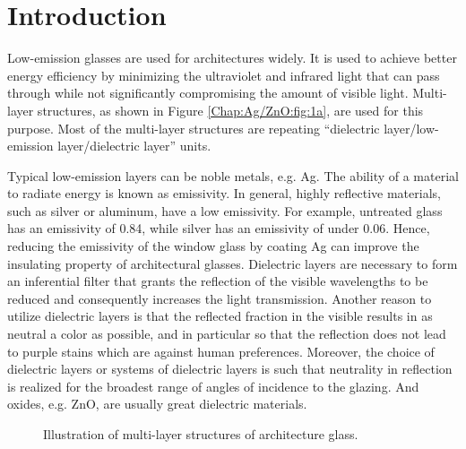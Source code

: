 \section{Introduction}

Low-emission glasses are used for architectures widely. It is used to achieve better energy efficiency by minimizing the ultraviolet and infrared light that can pass through while not significantly compromising the amount of visible light. Multi-layer structures, as shown in Figure \ref{Chap:Ag/ZnO:fig:1a}, are used for this purpose. Most of the multi-layer structures are repeating ``dielectric layer/low-emission layer/dielectric layer'' units.

Typical low-emission layers can be noble metals, e.g. Ag. The ability of a material to radiate energy is known as emissivity. In general, highly reflective materials, such as silver or aluminum, have a low emissivity. For example, untreated glass has an emissivity of 0.84, while silver has an emissivity of under 0.06\cite{salisbury1992emissivity}. Hence, reducing the emissivity of the window glass by coating Ag can improve the insulating property of architectural glasses. Dielectric layers are necessary to form an inferential filter that grants the reflection of the visible wavelengths to be reduced and consequently increases the light transmission. Another reason to utilize dielectric layers is that the reflected fraction in the visible results in as neutral a color as possible, and in particular so that the reflection does not lead to purple stains which are against human preferences. Moreover, the choice of dielectric layers or systems of dielectric layers is such that neutrality in reflection is realized for the broadest range of angles of incidence to the glazing. And oxides, e.g. ZnO, are usually great dielectric materials.

\newpage
\begingroup
\begin{figure}[!ht]
  \centering
  \label{Chap:Ag/ZnO:fig:1a}
\caption[Illustration of multi-layer structures and thin film morphology]{Illustration of multi-layer structures of architecture glass.}
  \label{Chap:Ag/ZnO:fig1}
\end{figure}
\endgroup

